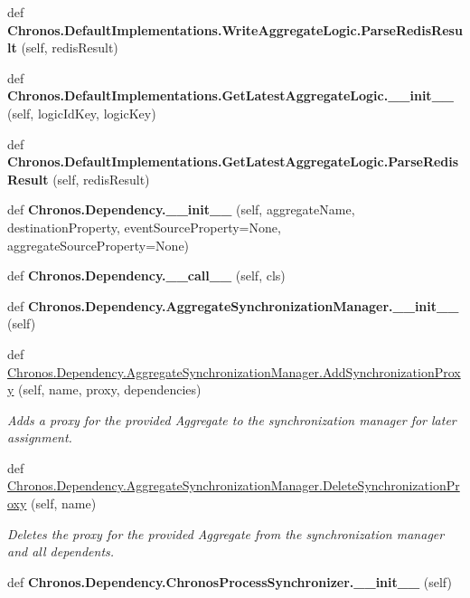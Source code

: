 \begin{DoxyCompactItemize}
\item 
def {\bfseries Chronos.\+Default\+Implementations.\+Write\+Aggregate\+Logic.\+Parse\+Redis\+Result} (self, redis\+Result)\hypertarget{group__Chronos_gaea941d2373595bec0061755f98e6881a}{}\label{group__Chronos_gaea941d2373595bec0061755f98e6881a}

\item 
def {\bfseries Chronos.\+Default\+Implementations.\+Get\+Latest\+Aggregate\+Logic.\+\_\+\+\_\+init\+\_\+\+\_\+} (self, logic\+Id\+Key, logic\+Key)\hypertarget{group__Chronos_ga94b66a615cd2b1dafceb0ff57a1d667e}{}\label{group__Chronos_ga94b66a615cd2b1dafceb0ff57a1d667e}

\item 
def {\bfseries Chronos.\+Default\+Implementations.\+Get\+Latest\+Aggregate\+Logic.\+Parse\+Redis\+Result} (self, redis\+Result)\hypertarget{group__Chronos_ga6640c92c5d19656a330556938f8b9a2c}{}\label{group__Chronos_ga6640c92c5d19656a330556938f8b9a2c}

\item 
def {\bfseries Chronos.\+Dependency.\+\_\+\+\_\+init\+\_\+\+\_\+} (self, aggregate\+Name, destination\+Property, event\+Source\+Property=None, aggregate\+Source\+Property=None)\hypertarget{group__Chronos_ga6f50f3e720c7b92d9500027c2cec6933}{}\label{group__Chronos_ga6f50f3e720c7b92d9500027c2cec6933}

\item 
def {\bfseries Chronos.\+Dependency.\+\_\+\+\_\+call\+\_\+\+\_\+} (self, cls)\hypertarget{group__Chronos_ga759879f23f1f9756beadac163349edab}{}\label{group__Chronos_ga759879f23f1f9756beadac163349edab}

\item 
def {\bfseries Chronos.\+Dependency.\+Aggregate\+Synchronization\+Manager.\+\_\+\+\_\+init\+\_\+\+\_\+} (self)\hypertarget{group__Chronos_ga1661999fac53ea64f18330d102a19771}{}\label{group__Chronos_ga1661999fac53ea64f18330d102a19771}

\item 
def \hyperlink{group__Chronos_gafe9e8666dcee9ec3f8e73f3ff92e2ded}{Chronos.\+Dependency.\+Aggregate\+Synchronization\+Manager.\+Add\+Synchronization\+Proxy} (self, name, proxy, dependencies)
\begin{DoxyCompactList}\small\item\em Adds a proxy for the provided Aggregate to the synchronization manager for later assignment. \end{DoxyCompactList}\item 
def \hyperlink{group__Chronos_gab57bfb327255df20320cc3e8f9a126c6}{Chronos.\+Dependency.\+Aggregate\+Synchronization\+Manager.\+Delete\+Synchronization\+Proxy} (self, name)
\begin{DoxyCompactList}\small\item\em Deletes the proxy for the provided Aggregate from the synchronization manager and all dependents. \end{DoxyCompactList}\item 
def {\bfseries Chronos.\+Dependency.\+Chronos\+Process\+Synchronizer.\+\_\+\+\_\+init\+\_\+\+\_\+} (self)\hypertarget{group__Chronos_ga41563111780ec0ec0d643013c5239305}{}\label{group__Chronos_ga41563111780ec0ec0d643013c5239305}


\end{DoxyCompactItemize}
